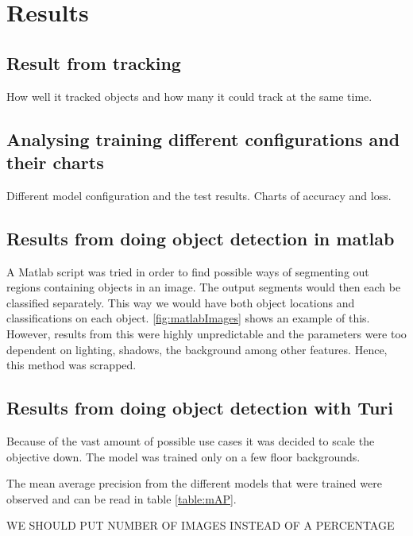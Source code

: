 \section{Results}
\subsection{Result from tracking}

How well it tracked objects and how many it could track at the same time.

\subsection{Analysing training different configurations and their charts}

Different model configuration and the test results. Charts of accuracy and loss.

\subsection{Results from doing object detection in matlab}
A Matlab script was tried in order to find possible ways of segmenting out regions containing objects in an image. The output segments would then each be classified separately. This way we would have both object locations and classifications on each object. \ref{fig:matlabImages} shows an example of this. However, results from this were highly unpredictable and the parameters were too dependent on lighting, shadows, the background among other features. Hence, this method was scrapped.

\subsection{Results from doing object detection with Turi}
Because of the vast amount of possible use cases it was decided to scale the objective down. The model was trained only on a few floor backgrounds. 

The mean average precision from the different models that were trained were observed and can be read in table \ref{table:mAP}. 

WE SHOULD PUT NUMBER OF IMAGES INSTEAD OF A PERCENTAGE

